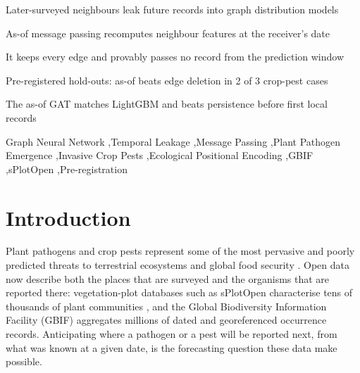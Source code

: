 \documentclass[a4paper,fleqn]{cas-sc}
\begin{document}
\begin{highlights}
\item Later-surveyed neighbours leak future records into graph distribution models
\item As-of message passing recomputes neighbour features at the receiver's date
\item It keeps every edge and provably passes no record from the prediction window
\item Pre-registered hold-outs: as-of beats edge deletion in 2 of 3 crop-pest cases
\item The as-of GAT matches LightGBM and beats persistence before first local records
\end{highlights}

\begin{keywords}
Graph Neural Network \sep Temporal Leakage \sep Message Passing \sep Plant Pathogen Emergence \sep Invasive Crop Pests \sep Ecological Positional Encoding \sep GBIF \sep sPlotOpen \sep Pre-registration
\end{keywords}

{\hfuzz=118pt\maketitle}

\section{Introduction}

Plant pathogens and crop pests represent some of the most pervasive and poorly predicted threats to terrestrial ecosystems and global food security \citep{bebber2014,fisher2012}. Open data now describe both the places that are surveyed and the organisms that are reported there: vegetation-plot databases such as sPlotOpen characterise tens of thousands of plant communities \citep{sabatini2021}, and the Global Biodiversity Information Facility (GBIF) aggregates millions of dated and georeferenced occurrence records. Anticipating where a pathogen or a pest will be reported next, from what was known at a given date, is the forecasting question these data make possible.
\end{document}
